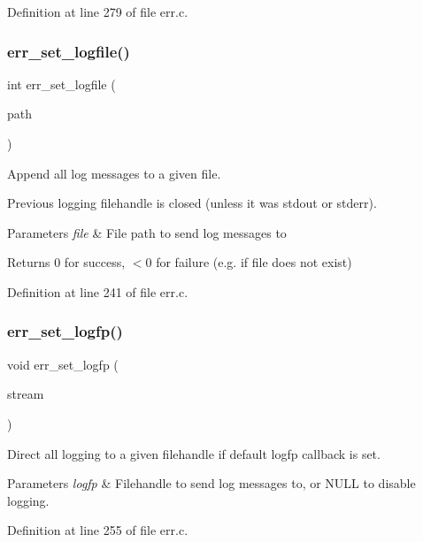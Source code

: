 Definition at line 279 of file err.\+c.

\mbox{\label{err_8c_ad6ec7800ca74f21b9f8f69fcc765f30b}} 
\subsubsection{err\+\_\+set\+\_\+logfile()}
{\footnotesize\ttfamily int err\+\_\+set\+\_\+logfile (\begin{DoxyParamCaption}\item[{const char $\ast$}]{path }\end{DoxyParamCaption})}



Append all log messages to a given file. 

Previous logging filehandle is closed (unless it was stdout or stderr).


\begin{DoxyParams}{Parameters}
{\em file} & File path to send log messages to \\
\hline
\end{DoxyParams}
\begin{DoxyReturn}{Returns}
0 for success, $<$0 for failure (e.\+g. if file does not exist) 
\end{DoxyReturn}


Definition at line 241 of file err.\+c.

\mbox{\label{err_8c_a1ed9de93e9eab18d18be6290b0b187e7}} 
\subsubsection{err\+\_\+set\+\_\+logfp()}
{\footnotesize\ttfamily void err\+\_\+set\+\_\+logfp (\begin{DoxyParamCaption}\item[{F\+I\+LE $\ast$}]{stream }\end{DoxyParamCaption})}



Direct all logging to a given filehandle if default logfp callback is set. 


\begin{DoxyParams}{Parameters}
{\em logfp} & Filehandle to send log messages to, or N\+U\+LL to disable logging. \\
\hline
\end{DoxyParams}


Definition at line 255 of file err.\+c.

